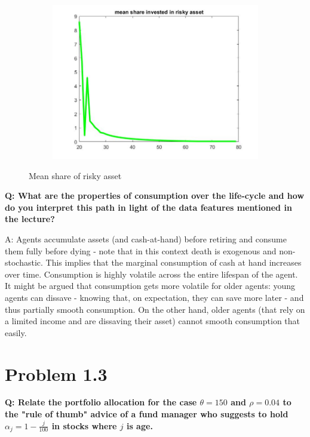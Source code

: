 \documentclass[12pt,a4paper]{article}
\begin{document}
\begin{figure}[h!]
\begin{subfigure}[b]{0.32\linewidth}
    \includegraphics[width=\linewidth]{graphs/Q2/mean_share3.jpg}
  \end{subfigure}
  \caption{Mean share of risky asset}
    \label{fig:4}
\end{figure}


\textbf{Q: What are the properties of consumption over the life-cycle and how do you interpret this path in light of the data features mentioned in the lecture?}

A: Agents accumulate assets (and cash-at-hand) before retiring and consume them fully before dying - note that in this context death is exogenous and non-stochastic. This implies that the marginal consumption of cash at hand increases over time. Consumption is highly volatile across the entire lifespan of the agent. It might be argued that consumption gets more volatile for older agents: young agents can dissave - knowing that, on expectation, they can save more later - and thus partially smooth consumption. On the other hand, older agents (that rely on a limited income and are dissaving their asset) cannot smooth consumption that easily.

\section*{Problem 1.3}

\textbf{Q: Relate the portfolio allocation for the case $\theta = 150$ and $\rho = 0.04$ to the "rule of thumb" advice of a fund manager who suggests to hold $\alpha_j = 1- \frac{j}{100}$ in stocks where $j$ is age.}
\end{document}
